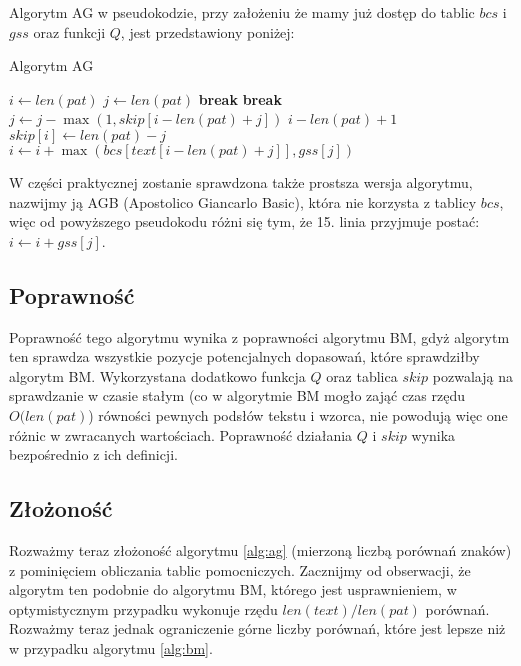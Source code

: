 \noindent
Algorytm AG w pseudokodzie, przy założeniu że mamy już dostęp do tablic $bcs$ i $gss$ oraz funkcji $Q$, jest przedstawiony poniżej:
\begin{algorithm}
\caption{Algorytm AG}\label{alg:ag}
\begin{algorithmic}[1]
\State $i \gets len(pat)$
    \State $j \gets len(pat)$
        \State \textbf{ break }
        \State \textbf{ break }
        \Else
        \State $j \gets j - \max(1, skip[i-len(pat)+j])$
        \EndIf
    \EndWhile
        \State \Return $i-len(pat)+1$
    \EndIf
    \State $skip[i] \gets len(pat)-j$
    \State $i \gets i + \max(bcs[text[i-len(pat)+j]], gss[j])$
\EndWhile
\end{algorithmic}
\end{algorithm}

\FloatBarrier
W części praktycznej zostanie sprawdzona także prostsza wersja algorytmu, nazwijmy ją AGB (Apostolico Giancarlo Basic), która nie korzysta z tablicy $bcs$, więc od powyższego pseudokodu różni się tym, że 15. linia przyjmuje postać: $i \gets i + gss[j]$.

\subsection{Poprawność}
Poprawność tego algorytmu wynika z poprawności algorytmu BM, gdyż algorytm ten sprawdza wszystkie pozycje potencjalnych dopasowań, które sprawdziłby algorytm BM. Wykorzystana dodatkowo funkcja $Q$ oraz tablica $skip$ pozwalają na sprawdzanie w czasie stałym (co w algorytmie BM mogło zająć czas rzędu $O(len(pat)$) równości pewnych podsłów tekstu i wzorca, nie powodują więc one różnic w zwracanych wartościach. Poprawność działania $Q$ i $skip$ wynika bezpośrednio z ich definicji.

\subsection{Złożoność}
Rozważmy teraz złożoność algorytmu \ref{alg:ag} (mierzoną liczbą porównań znaków) z pominięciem obliczania tablic pomocniczych. Zacznijmy od obserwacji, że algorytm ten podobnie do algorytmu BM, którego jest usprawnieniem, w optymistycznym przypadku wykonuje rzędu $len(text)/len(pat)$ porównań. Rozważmy teraz jednak ograniczenie górne liczby porównań, które jest lepsze niż w przypadku algorytmu \ref{alg:bm}.

